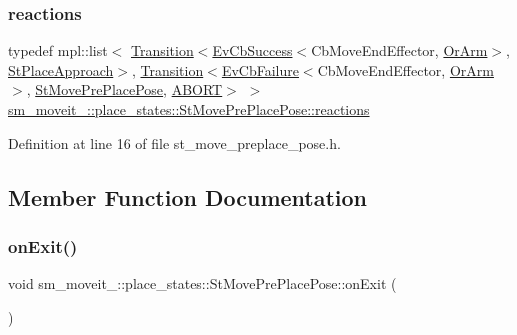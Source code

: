 \subsubsection{\texorpdfstring{reactions}{reactions}}
{\footnotesize\ttfamily typedef mpl\+::list$<$ \hyperlink{classsmacc_1_1Transition}{Transition}$<$\hyperlink{structsmacc_1_1EvCbSuccess}{Ev\+Cb\+Success}$<$Cb\+Move\+End\+Effector, \hyperlink{classsm__moveit__4_1_1OrArm}{Or\+Arm}$>$, \hyperlink{structsm__moveit__4_1_1place__states_1_1StPlaceApproach}{St\+Place\+Approach}$>$, \hyperlink{classsmacc_1_1Transition}{Transition}$<$\hyperlink{structsmacc_1_1EvCbFailure}{Ev\+Cb\+Failure}$<$Cb\+Move\+End\+Effector, \hyperlink{classsm__moveit__4_1_1OrArm}{Or\+Arm}$>$, \hyperlink{structsm__moveit__4_1_1place__states_1_1StMovePrePlacePose}{St\+Move\+Pre\+Place\+Pose}, \hyperlink{structsmacc_1_1default__transition__tags_1_1ABORT}{A\+B\+O\+RT}$>$ $>$ \hyperlink{structsm__moveit__4_1_1place__states_1_1StMovePrePlacePose_a70ea071312303af96209b8da75e30d4d}{sm\+\_\+moveit\+\_\+::place\+\_\+states\+::\+St\+Move\+Pre\+Place\+Pose\+::reactions}}



Definition at line 16 of file st\+\_\+move\+\_\+preplace\+\_\+pose.\+h.



\subsection{Member Function Documentation}
\mbox{\label{structsm__moveit__4_1_1place__states_1_1StMovePrePlacePose_a4c62c5fdaa740b27f6af5c47d3507dad}} 
\subsubsection{\texorpdfstring{on\+Exit()}{onExit()}}
{\footnotesize\ttfamily void sm\+\_\+moveit\+\_\+::place\+\_\+states\+::\+St\+Move\+Pre\+Place\+Pose\+::on\+Exit (\begin{DoxyParamCaption}{ }\end{DoxyParamCaption})\hspace{0.3cm}{\ttfamily [inline]}}



